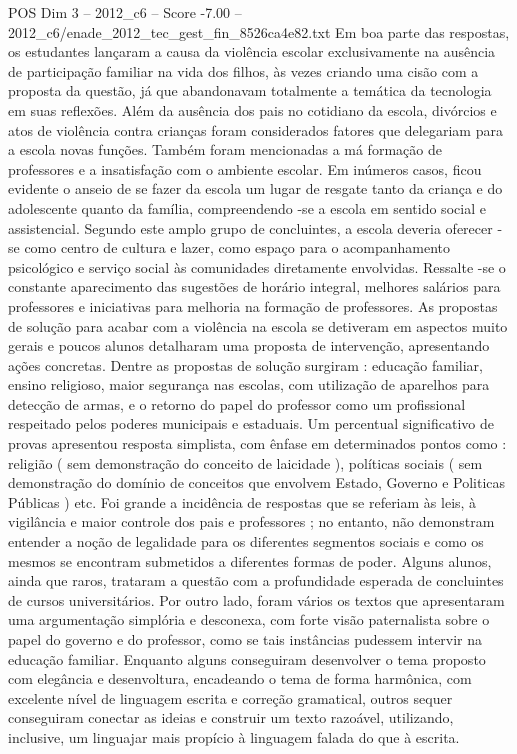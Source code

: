 \begin{textsample}{POS Dim 3 – 2012\_c6 – Score -7.00 – 2012\_c6/enade\_2012\_tec\_gest\_fin\_8526ca4e82.txt}
Em boa parte das respostas, os estudantes lançaram a causa da violência escolar exclusivamente na ausência de participação familiar na vida dos filhos, às vezes criando uma cisão com a proposta da questão, já que abandonavam totalmente a temática da tecnologia em suas reflexões.
Além da ausência dos pais no cotidiano da escola, divórcios e atos de violência contra crianças foram considerados fatores que delegariam para a escola novas funções.
Também foram mencionadas a má formação de professores e a insatisfação com o ambiente escolar.
Em inúmeros casos, ficou evidente o anseio de se fazer da escola um lugar de resgate tanto da criança e do adolescente quanto da família, compreendendo -se a escola em sentido social e assistencial.
Segundo este amplo grupo de concluintes, a escola deveria oferecer -se como centro de cultura e lazer, como espaço para o acompanhamento psicológico e serviço social às comunidades diretamente envolvidas.
Ressalte -se o constante aparecimento das sugestões de horário integral, melhores salários para professores e iniciativas para melhoria na formação de professores.
As propostas de solução para acabar com a violência na escola se detiveram em aspectos muito gerais e poucos alunos detalharam uma proposta de intervenção, apresentando ações concretas.
Dentre as propostas de solução surgiram : educação familiar, ensino religioso, maior segurança nas escolas, com utilização de aparelhos para detecção de armas, e o retorno do papel do professor como um profissional respeitado pelos poderes municipais e estaduais.
Um percentual significativo de provas apresentou resposta simplista, com ênfase em determinados pontos como : religião ( sem demonstração do conceito de laicidade ), políticas sociais ( sem demonstração do domínio de conceitos que envolvem Estado, Governo e Politicas Públicas ) etc.
Foi grande a incidência de respostas que se referiam às leis, à vigilância e maior controle dos pais e professores ; no entanto, não demonstram entender a noção de legalidade para os diferentes segmentos sociais e como os mesmos se encontram submetidos a diferentes formas de poder.
Alguns alunos, ainda que raros, trataram a questão com a profundidade esperada de concluintes de cursos universitários.
Por outro lado, foram vários os textos que apresentaram uma argumentação simplória e desconexa, com forte visão paternalista sobre o papel do governo e do professor, como se tais instâncias pudessem intervir na educação familiar.
Enquanto alguns conseguiram desenvolver o tema proposto com elegância e desenvoltura, encadeando o tema de forma harmônica, com excelente nível de linguagem escrita e correção gramatical, outros sequer conseguiram conectar as ideias e construir um texto razoável, utilizando, inclusive, um linguajar mais propício à linguagem falada do que à escrita.

\end{textsample}
